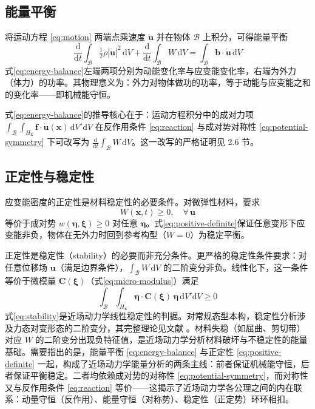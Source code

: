 \subsection{能量平衡}

将运动方程 \eqref{eq:motion} 两端点乘速度 $\dot{\mathbf{u}}$ 并在物体 $\mathcal{B}$ 上积分，可得能量平衡
\begin{equation}
  \frac{\mathrm{d}}{\mathrm{d}t}\int_{\mathcal{B}}\tfrac{1}{2}\rho|\dot{\mathbf{u}}|^{2}\,\mathrm{d}V+\frac{\mathrm{d}}{\mathrm{d}t}\int_{\mathcal{B}}W\,\mathrm{d}V=\int_{\mathcal{B}}\mathbf{b}\cdot\dot{\mathbf{u}}\,\mathrm{d}V
  \label{eq:energy-balance}
\end{equation}
式\eqref{eq:energy-balance}左端两项分别为动能变化率与应变能变化率，右端为外力（体力）的功率。其物理意义为：外力对物体做功的功率，等于动能与应变能之和的变化率——即机械能守恒。

式\eqref{eq:energy-balance}的推导核心在于：运动方程积分中的成对力项 $\int_{\mathcal{B}}\int_{H_{\mathbf{x}}}\mathbf{f}\cdot\dot{\mathbf{u}}(\mathbf{x})\,\mathrm{d}V'\mathrm{d}V$ 在反作用条件 \eqref{eq:reaction} 与成对势对称性 \eqref{eq:potential-symmetry} 下可改写为 $\frac{\mathrm{d}}{\mathrm{d}t}\int_{\mathcal{B}}W\,\mathrm{d}V$。这一改写的严格证明见 2.6 节。

\subsection{正定性与稳定性}

应变能密度的正定性是材料稳定性的必要条件。对微弹性材料，要求
\begin{equation}
  W(\mathbf{x},t)\geq 0,\quad\forall\,\mathbf{u}
  \label{eq:positive-definite}
\end{equation}
等价于成对势 $w(\boldsymbol{\eta},\boldsymbol{\xi})\geq 0$ 对任意 $\boldsymbol{\eta}$。式\eqref{eq:positive-definite}保证任意变形下应变能非负，物体在无外力时回到参考构型（$W=0$）为稳定平衡。

正定性是稳定性（stability）的必要而非充分条件。更严格的稳定性条件要求：对任意位移场 $\mathbf{u}$（满足边界条件），$\int_{\mathcal{B}}W\,\mathrm{d}V$ 的二阶变分非负。线性化下，这一条件等价于微模量 $\mathbf{C}(\boldsymbol{\xi})$（式\eqref{eq:micro-modulus}）满足
\begin{equation}
  \int_{\mathcal{B}}\int_{H_{\mathbf{x}}}\boldsymbol{\eta}\cdot\mathbf{C}(\boldsymbol{\xi})\,\boldsymbol{\eta}\,\mathrm{d}V'\mathrm{d}V\geq 0
  \label{eq:stability}
\end{equation}
式\eqref{eq:stability}是近场动力学线性稳定性的判据。对常规态型本构，稳定性分析涉及力态对变形态的二阶变分，其完整理论见文献 \cite{Silling2017}。材料失稳（如屈曲、剪切带）对应 $W$ 的二阶变分出现负特征值，是近场动力学分析材料破坏与不稳定性的能量基础。需要指出的是，能量平衡 \eqref{eq:energy-balance} 与正定性 \eqref{eq:positive-definite} 一起，构成了近场动力学能量分析的两条主线：前者保证机械能守恒，后者保证平衡稳定。二者均依赖成对势的对称性 \eqref{eq:potential-symmetry}，而对称性又与反作用条件 \eqref{eq:reaction} 等价——这揭示了近场动力学各公理之间的内在联系：动量守恒（反作用）、能量守恒（对称势）、稳定性（正定势）环环相扣。

